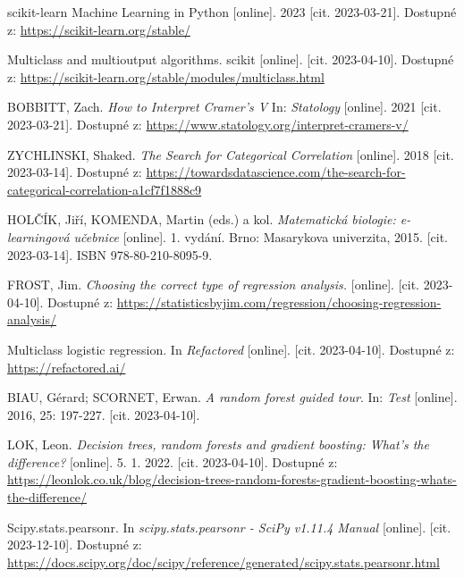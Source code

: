 \begin{thebibliography}{1}
scikit-learn Machine Learning in Python [online]. 2023 [cit. 2023-03-21]. Dostupné z: \url{https://scikit-learn.org/stable/}

Multiclass and multioutput algorithms. scikit [online]. [cit. 2023-04-10]. Dostupné z: \url{https://scikit-learn.org/stable/modules/multiclass.html} 

BOBBITT, Zach. \textit{How to Interpret Cramer's V} In: \textit{Statology} [online]. 2021 [cit. 2023-03-21]. Dostupné z: \url{https://www.statology.org/interpret-cramers-v/}

ZYCHLINSKI, Shaked. \textit{The Search for Categorical Correlation} [online]. 2018 [cit. 2023-03-14]. Dostupné z: \url{https://towardsdatascience.com/the-search-for-categorical-correlation-a1cf7f1888c9}

HOLČÍK, Jiří, KOMENDA, Martin (eds.) a kol. \textit{Matematická biologie: e-learningová učebnice} [online]. 
1. vydání. Brno: Masarykova univerzita, 2015. [cit. 2023-03-14]. ISBN 978-80-210-8095-9.

FROST, Jim. \textit{Choosing the correct type of regression analysis.} [online]. [cit. 2023-04-10]. Dostupné z: \url{https://statisticsbyjim.com/regression/choosing-regression-analysis/}

Multiclass logistic regression. In \textit{Refactored} [online]. [cit. 2023-04-10]. Dostupné z: \url{https://refactored.ai/}

BIAU, Gérard; SCORNET, Erwan. \textit{A random forest guided tour}. In: \textit{Test} [online]. 2016, 25: 197-227. [cit. 2023-04-10].

LOK, Leon. \textit{Decision trees, random forests and gradient boosting: What's the difference?} [online]. 5. 1. 2022. [cit. 2023-04-10]. Dostupné z: \url{https://leonlok.co.uk/blog/decision-trees-random-forests-gradient-boosting-whats-the-difference/}

Scipy.stats.pearsonr. In \textit{scipy.stats.pearsonr - SciPy v1.11.4 Manual} [online]. [cit. 2023-12-10]. Dostupné z: \url{https://docs.scipy.org/doc/scipy/reference/generated/scipy.stats.pearsonr.html} 

\end{thebibliography}
	
% 
	
	